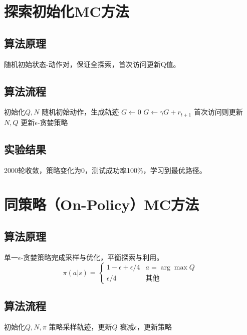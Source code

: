 \documentclass[11pt,a4paper]{article}
\begin{document}
\section{探索初始化MC方法}
\subsection{算法原理}
随机初始状态-动作对，保证全探索，首次访问更新Q值。

\subsection{算法流程}
\begin{algorithm}[H]
\caption{探索初始化MC}
\begin{algorithmic}[1]
\STATE 初始化$Q,N$
    \STATE 随机初始动作，生成轨迹
    \STATE $G \leftarrow 0$
        \STATE $G \leftarrow \gamma G + r_{t+1}$
        \STATE 首次访问则更新$N,Q$
    \ENDFOR
    \STATE 更新$\epsilon$-贪婪策略
\ENDFOR
\end{algorithmic}
\end{algorithm}

\subsection{实验结果}
2000轮收敛，策略变化为0，测试成功率100\%，学习到最优路径。

\section{同策略（On-Policy）MC方法}
\subsection{算法原理}
单一$\epsilon$-贪婪策略完成采样与优化，平衡探索与利用。
\[ \pi(a|s) = \begin{cases} 1-\epsilon+\epsilon/4 & a=\arg\max Q \\ \epsilon/4 & \text{其他} \end{cases} \]

\subsection{算法流程}
\begin{algorithm}[H]
\caption{同策略MC}
\begin{algorithmic}[1]
\STATE 初始化$Q,N,\pi$
    \STATE 策略采样轨迹，更新$Q$
    \STATE 衰减$\epsilon$，更新策略
\ENDFOR
\end{algorithmic}
\end{algorithm}
\end{document}
